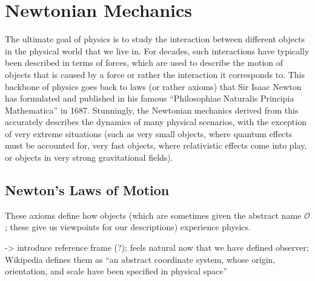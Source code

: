 \documentclass[../class_mech_main.tex]{subfiles}
\begin{document}
\chapter{Newtonian Mechanics}

The ultimate goal of physics is to study the interaction between different objects in the physical world that we live in. For decades, such interactions have typically been described in terms of forces, which are used to describe the motion of objects that is caused by a force or rather the interaction it corresponds to. This backbone of physics goes back to laws (or rather axioms) that Sir Isaac Newton has formulated and published in his famous \enquote{Philosophiae Naturalis Principia Mathematica} in 1687. Stunningly, the Newtonian mechanics derived from this accurately describes the dynamics of many physical scenarios, with the exception of very extreme situations (such as very small objects, where quantum effects must be accounted for, very fast objects, where relativistic effects come into play, or objects in very strong gravitational fields). 



    \section{Newton's Laws of Motion}
% 
% 
These axioms define how objects (which are sometimes given the abstract name  $\mathcal{O}$; these give us viewpoints for our descriptions) experience physics. 

-> introduce reference frame (?); feels natural now that we have defined observer; Wikipedia defines them as \enquote{an abstract coordinate system, whose origin, orientation, and scale have been specified in physical space}
\end{document}
